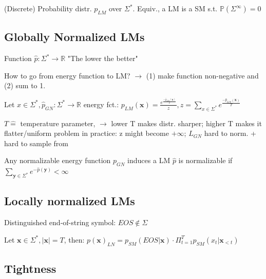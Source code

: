 (Discrete) Probability distr. \(p_{LM}\) over \(\Sigma^*\). Equiv., a LM is a SM s.t. \(\mathbb{P}(\Sigma^\infty) = 0\)

\subsection{Globally Normalized LMs}

 Function \(\hat{p}: \Sigma^* \rightarrow \mathbb{R}\)
\comment "The lower the better"

How to go from energy function to LM? \(\rightarrow\) (1) make function non-negative and (2) sum to 1.

 Let \(x \in \Sigma^*, \hat{p}_{GN}: \Sigma^*\to \mathbb{R}\) energy fct.:
$
p_{LM}(\mathbf{x}) = \frac{e^\frac{-\hat{p}_{GN}(\mathbf{x})}{T}}{z},
z = \sum_{x \in \Sigma^*} e^{\frac{- \hat{p}_{GN}(\mathbf{x})}{T}}
$

\(T \hat{=}\) temperature parameter,
\(\rightarrow\) lower T makes distr. sharper; higher T makes it flatter/uniform
\comment problem in practice: z might become \(+\infty\); $L_{GN}$ hard to norm. + hard to sample from

\theorem Any normalizable energy function $p_{GN}$ induces a LM
\comment $\hat{p}$ is normalizable if $\sum_{\mathbf{y}\in\Sigma^*}e^{-\hat{p}(\mathbf{y})}<\infty$

\subsection{Locally normalized LMs}

 Distinguished end-of-string symbol: \(EOS \notin \Sigma\)

 Let \(\mathbf{x} \in \Sigma^*, |\mathbf{x}| = T\), then:
$
p(\mathbf{x})_{LN} = p_{SM}(EOS|\mathbf{x}) \cdot \Pi_{t=1}^T p_{SM}(x_t|\mathbf{x}_{<t})
$



\subsection{Tightness}

